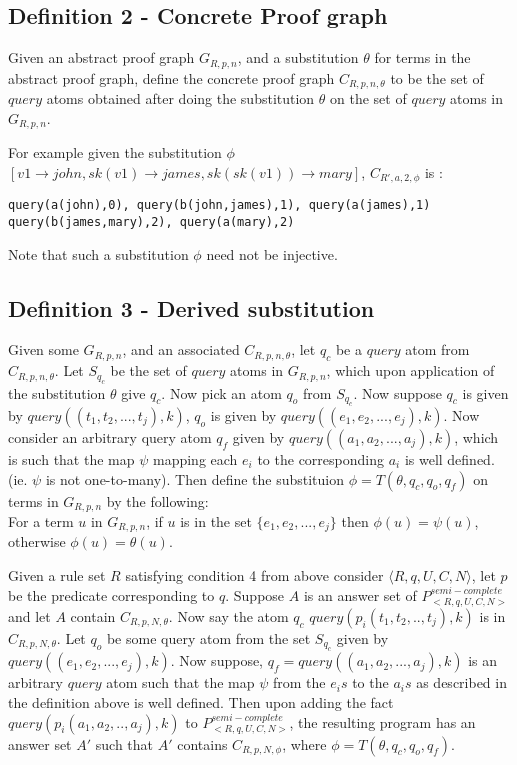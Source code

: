 \documentclass[sigconf]{acmart}
\begin{document}
\subsection{Definition 2 - Concrete Proof graph}

Given an abstract proof graph $G_{R,p,n}$, and a substitution $\theta$ for
terms in the abstract proof graph, define the concrete proof graph
$C_{R,p,n,\theta}$ to be the set of $query$ atoms obtained after doing the
substitution $\theta$ on the set of $query$ atoms in $G_{R,p,n}$.

For example given the substitution $\phi$ $[v1\rightarrow john, sk(v1)
\rightarrow james, sk(sk(v1))\rightarrow mary]$, $C_{R',a,2,\phi}$ is :

\begin{verbatim}
query(a(john),0), query(b(john,james),1), query(a(james),1)
query(b(james,mary),2), query(a(mary),2) \end{verbatim}
Note that such a substitution $\phi$ need not be injective.


\subsection{Definition 3 - Derived substitution}
Given some $G_{R,p,n}$, and an associated $C_{R,p,n,\theta}$, let $q_{c}$ be a $query$ atom from $C_{R,p,n,\theta}$. Let $S_{q_{c}}$ be the set of $query$ atoms in $G_{R,p,n}$, which upon application of the substitution $\theta$ give $q_{c}$. Now pick an atom $q_{o}$ from $S_{q_{c}}$. Now suppose $q_{c}$ is given by $query((t_{1},t_{2},...,t_{j}),k)$, $q_{o}$ is given by $query((e_{1},e_{2},...,e_{j}),k)$. Now consider an arbitrary query atom $q_{f}$ given by $query((a_{1},a_{2},...,a_{j}),k)$, which is such that the map $\psi$ mapping each $e_{i}$ to the corresponding $a_{i}$ is well defined. (ie. $\psi$ is not one-to-many). Then define the substituion $\phi = T(\theta, q_{c},q_{o},q_{f})$ on terms in $G_{R,p,n}$ by the following:\\ For a term $u$ in $G_{R,p,n}$, if $u$ is in the set $\{e_{1},e_{2},...,e_{j}\}$ then $\phi(u) = \psi(u)$, otherwise $\phi(u) = \theta(u)$.

\begin{theorem}\label{thm:termsub}
Given a rule set $R$ satisfying condition 4 from above consider $\langle R,q,U,C,N\rangle$,
let $p$ be the predicate corresponding to $q$. Suppose $A$ is an answer set of
$P^{semi-complete}_{<R,q,U,C,N>}$ and let $A$ contain $C_{R,p,N,\theta}$. Now
say the atom $q_{c}$ $query(p_{i}(t_{1},t_{2},..,t_{j}),k)$ is in
$C_{R,p,N,\theta}$. Let $q_{o}$ be some query atom from the set $S_{q_{c}}$
given by $query((e_{1},e_{2},...,e_{j}),k)$. Now suppose, $q_{f}=
query((a_{1},a_{2},...,a_{j}),k)$ is an arbitrary $query$ atom such that the
map $\psi$ from the $e_{i}s$ to the $a_{i}s$ as described in the definition
above is well defined. Then upon adding the fact
$query(p_{i}(a_{1},a_{2},..,a_{j}),k)$ to $P^{semi-complete}_{<R,q,U,C,N>}$,
the resulting program has an answer set $A'$ such that $A'$ contains
$C_{R,p,N,\phi}$, where $\phi = T(\theta, q_{c}, q_{o}, q_{f})$.
\end{theorem}
\end{document}
